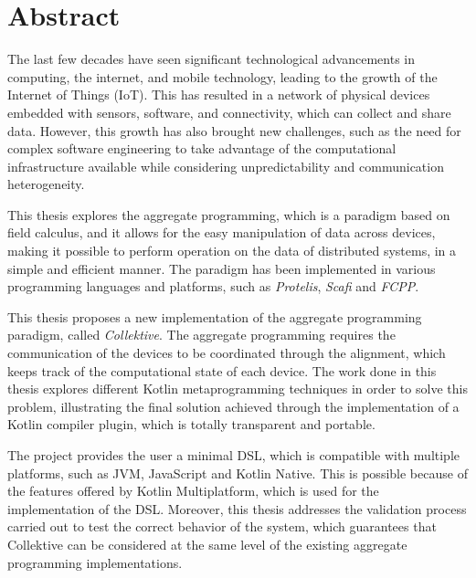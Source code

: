 \chapter*{Abstract}

The last few decades have seen significant technological advancements in computing, the internet, and mobile technology, leading to the growth of the Internet of Things (IoT). This has resulted in a network of physical devices embedded with sensors, software, and connectivity, which can collect and share data. However, this growth has also brought new challenges, such as the need for complex software engineering to take advantage of the computational infrastructure available while considering unpredictability and communication heterogeneity.

This thesis explores the aggregate programming, which is a paradigm based on field calculus, and it allows for the easy manipulation of data across devices, making it possible to perform operation on the data of distributed systems, in a simple and efficient manner. The paradigm has been implemented in various programming languages and platforms, such as \textit{Protelis}, \textit{Scafi} and \textit{FCPP}.

This thesis proposes a new implementation of the aggregate programming paradigm, called \textit{Collektive}.\newline
The aggregate programming requires the communication of the devices to be coordinated through the alignment, which keeps track of the computational state of each device. The work done in this thesis explores different Kotlin metaprogramming techniques in order to solve this problem, illustrating the final solution achieved through the implementation of a Kotlin compiler plugin, which is totally transparent and portable.

The project provides the user a minimal DSL, which is compatible with multiple platforms, such as JVM, JavaScript and Kotlin Native. This is possible because of the features offered by Kotlin Multiplatform, which is used for the implementation of the DSL.
Moreover, this thesis addresses the validation process carried out to test the correct behavior of the system, which guarantees that Collektive can be considered at the same level of the existing aggregate programming implementations.
